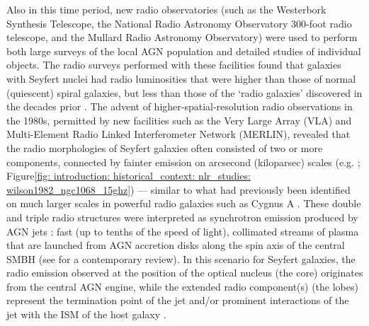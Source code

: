 Also in this time period, new radio observatories (such as the Westerbork Synthesis Telescope, the National Radio Astronomy Observatory 300-foot radio telescope, and the Mullard Radio Astronomy Observatory) were used to perform both large surveys of the local AGN population and detailed studies of individual objects. The radio surveys performed with these facilities found that galaxies with Seyfert nuclei had radio luminosities that were higher than those of normal (quiescent) spiral galaxies, but less than those of the `radio galaxies' discovered in the decades prior \citep{vanderKruit1973, Sramek1975}. The advent of higher-spatial-resolution radio observations in the 1980s, permitted by new facilities such as the Very Large Array (VLA) and Multi-Element Radio Linked Interferometer Network (MERLIN), revealed that the radio morphologies of Seyfert galaxies often consisted of two or more components, connected by fainter emission on arcsecond (kiloparsec) scales (e.g. \citealt{Wilson1980, Wilson1982, Pedlar1983, Pedlar1984, Ulvestad1984}; Figure\;\ref{fig: introduction: historical_context: nlr_studies: wilson1982_ngc1068_15ghz}) --- similar to what had previously been identified on much larger scales in powerful radio galaxies such as Cygnus A \citep{Jennison1959}. These double and triple radio structures were interpreted as synchrotron emission produced by AGN jets \citep{Wilson1980}: fast (up to tenths of the speed of light), collimated streams of plasma that are launched from AGN accretion disks along the spin axis of the central SMBH (see \citealt{Rees1984} for a contemporary review). In this scenario for Seyfert galaxies, the radio emission observed at the position of the optical nucleus (the core) originates from the central AGN engine, while the extended radio component(s) (the lobes) represent the termination point of the jet and/or prominent interactions of the jet with the ISM of the host galaxy \citep{Wilson1980, Sanders1984}.

